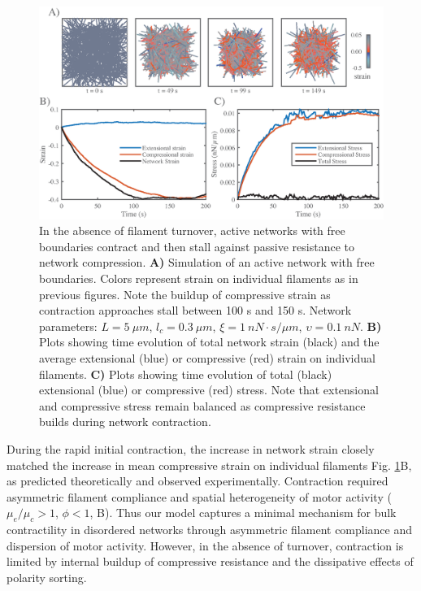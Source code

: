 \begin{figure}[h!]
	\centering
	\includegraphics[width=\hsize]{active/figures/Fig5}
	\caption{\label{fig:active_con} In the absence of filament turnover, active networks with free boundaries contract and then stall against passive resistance to network compression. \textbf{A)}  Simulation of an active network with free boundaries. Colors represent strain on individual filaments as in previous figures.  Note the buildup of compressive strain as contraction approaches stall between 100 s and 150 s.  Network parameters: $L=5\: \mu m$, $l_c=0.3\: \mu m$, $\xi=1\: nN\cdot s/\mu m$, $\upsilon=0.1\: nN$.  \textbf{B)} Plots showing time evolution of total network strain (black) and the average extensional (blue) or compressive (red) strain on individual filaments.   \textbf{C)} Plots showing time evolution of total (black) extensional (blue) or compressive (red) stress.  Note that extensional and compressive stress remain balanced as compressive resistance builds during network contraction.}
\end{figure}

During the rapid initial contraction, the increase in network strain closely matched the increase in mean compressive strain on individual filaments Fig. \ref{fig:active_con}B, as predicted theoretically \cite{1367-2630-14-3-033037,PhysRevX.4.041002} and observed experimentally\cite{rheo_2D1}. Contraction required asymmetric filament compliance and spatial heterogeneity of motor activity ($\mu_e/\mu_c > 1$, $\phi<1$, B). Thus our model captures a minimal mechanism for bulk contractility in disordered networks through asymmetric filament compliance and dispersion of motor activity. However, in the absence of turnover, contraction is limited by internal buildup of compressive resistance and the dissipative effects of polarity sorting.



